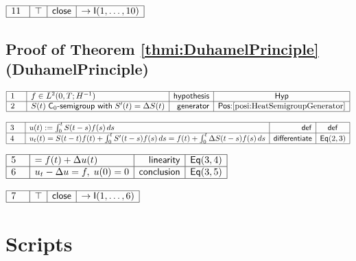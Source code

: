 \documentclass[11pt,reqno]{amsart}
\begin{document}
	\par\nointerlineskip\noindent$\begin{array}{|m{0.5cm}|l|r|c|}
	\hline
	11 & \top & \mathsf{close} & \to\mathsf{I}(1,\dots,10) \\ \hline
	\end{array}$
	
	\subsection*{Proof of Theorem \protect\ref{thmi:DuhamelPrinciple} (\textsf{DuhamelPrinciple})}
	\noindent$\begin{array}{|m{0.5cm}|l|r|c|}
	\hline
	1 & f\in L^{2}(0,T;H^{-1}) & \mathsf{hypothesis} & \mathsf{Hyp} \\ \hline
	2 & S(t)\;\textsf{C}_{0}\text{-}\mathsf{semigroup\ with}\;S^{\prime}(t)=\Delta S(t) & \mathsf{generator} & \textsf{Pos:}\ref{posi:HeatSemigroupGenerator} \\ \hline
	\end{array}$
	\par\nointerlineskip\noindent$\begin{array}{|m{0.5cm}|l|r|c|}
	\hline
	3 & u(t):=\int_{0}^{t}S(t-s)f(s)\,ds & \mathsf{def} & \mathsf{def} \\ \hline
	4 & u_{t}(t)=S(t-t)f(t)+\int_{0}^{t}S^{\prime}(t-s)f(s)\,ds=f(t)+\int_{0}^{t}\Delta S(t-s)f(s)\,ds & \mathsf{differentiate} & \mathsf{Eq}(2,3) \\ \hline
	\end{array}$
	\par\nointerlineskip\noindent$\begin{array}{|m{0.5cm}|l|r|c|}
	\hline
	5 & =f(t)+\Delta u(t) & \mathsf{linearity} & \mathsf{Eq}(3,4) \\ \hline
	6 & u_{t}-\Delta u=f,\;u(0)=0 & \mathsf{conclusion} & \mathsf{Eq}(3,5) \\ \hline
	\end{array}$
	\par\nointerlineskip\noindent$\begin{array}{|m{0.5cm}|l|r|c|}
	\hline
	7 & \top & \mathsf{close} & \to\mathsf{I}(1,\dots,6) \\ \hline
	\end{array}$

	\section{Scripts}
	
\end{document}
